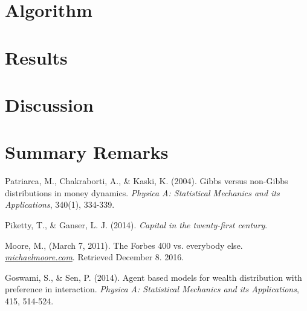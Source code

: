 \documentclass[10pt, a4paper]{amsart}
\begin{document}
\section{Algorithm}

\section{Results}

\section{Discussion}

\section{Summary Remarks}


\begin{thebibliography}{10}

 Patriarca, M., Chakraborti, A., \& Kaski, K. (2004). 
	Gibbs versus non-Gibbs distributions in money dynamics. 
	\emph{Physica A: Statistical Mechanics and its Applications},
	340(1), 334-339.
	
 Piketty, T., \& Ganser, L. J. (2014).
	\emph{Capital in the twenty-first century}.
	
 Moore, M., (March 7, 2011).
	The Forbes 400 vs. everybody else.
	\emph{\href{https://web.archive.org/web/20110309211959/http://www.michaelmoore.com/words/must-read/forbes-400-vs-everybody-else}{michaelmoore.com}}.
	Retrieved December 8. 2016.

 Goswami, S., \& Sen, P. (2014).
	Agent based models for wealth distribution with preference in interaction.
	\emph{Physica A: Statistical Mechanics and its Applications},
	415, 514-524.

\end{thebibliography}
\end{document}
